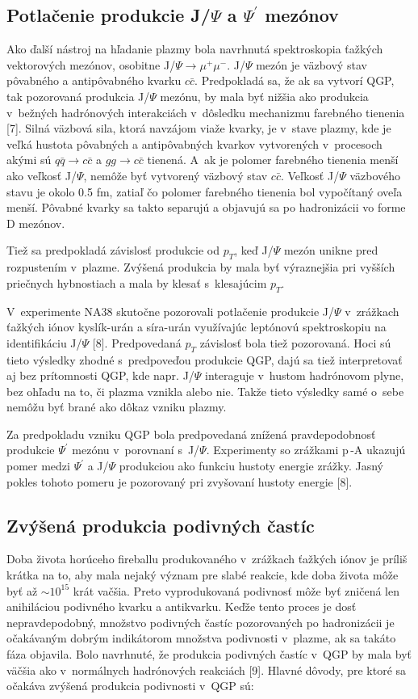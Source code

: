 \subsection{Potlačenie produkcie J/$\Psi$ a $\Psi^{'}$ mezónov}
Ako ďalší nástroj na hľadanie plazmy bola navrhnutá 
spektroskopia ťažkých vektorových mezónov, osobitne J/$\Psi
\longrightarrow \mu^{+} \mu^{-}$. J/$\Psi$ mezón je väzbový stav
pôvabného a antipôvabného kvarku $c\bar{c}$. Predpokladá sa, že
ak sa vytvorí QGP, tak pozorovaná produkcia J/$\Psi$ mezónu, by mala
byť nižšia ako produkcia v~bežných hadrónových
interakciách v~dôsledku mechanizmu farebného tienenia [7]. Silná
väzbová sila, ktorá navzájom viaže kvarky, je v~stave plazmy,
kde je veľká hustota pôvabných a antipôvabných kvarkov
vytvorených v~procesoch akými sú $q\bar{q} \rightarrow c\bar{c}$ a $gg
\rightarrow c\bar{c}$ tienená.
A~ak je polomer farebného tienenia menší ako veľkosť
J/$\Psi$, nemôže byť vytvorený väzbový stav $c\bar{c}$.
Veľkosť J/$\Psi$ väzbového stavu je okolo 0.5 fm, zatiaľ
čo polomer farebného tienenia  bol vypočítaný oveľa
menší. Pôvabné kvarky sa takto separujú a objavujú sa po
hadronizácii vo forme D mezónov.

Tiež sa predpokladá závislosť produkcie od $p_{T}$, keď
 J/$\Psi$  mezón unikne pred rozpustením v~plazme.
Zvýšená produkcia by mala byť výraznejšia pri
vyšších priečnych hybnostiach a mala by klesať 
s~klesajúcim $p_{T}$.

V~experimente NA38 skutočne pozorovali potlačenie produkcie
J/$\Psi$  v~zrážkach ťažkých iónov kyslík-urán a
síra-urán využívajúc leptónovú spektroskopiu na
identifikáciu J/$\Psi$ [8]. Predpovedaná $p_{T}$ závislosť bola
tiež pozorovaná. Hoci sú tieto výsledky zhodné s~predpoveďou
produkcie QGP, dajú sa tiež interpretovať aj bez prítomnosti
QGP, kde napr. J/$\Psi$ interaguje v~hustom hadrónovom plyne,
bez ohľadu na to, či plazma vznikla alebo nie. Takže tieto
výsledky samé o~sebe nemôžu byť brané ako dôkaz vzniku
plazmy.

Za predpokladu vzniku QGP bola predpovedaná znížená
pravdepodobnosť produkcie  $\Psi^{'}$ mezónu v~porovnaní
s~J/$\Psi$.
Experimenty so zrážkami p$\,$-A  ukazujú pomer medzi $\Psi^{'}$ a
J/$\Psi$ produkciou ako funkciu hustoty energie zrážky. Jasný pokles
tohoto pomeru je pozorovaný pri zvyšovaní hustoty energie [8].

\newpage \subsection{Zvýšená produkcia podivných častíc}
Doba života horúceho fireballu produkovaného v~zrážkach ťažkých
iónov je príliš krátka na to, aby mala
nejaký význam pre slabé reakcie, kde doba života môže byť
až $\sim 10^{15}$ krát vačšia. Preto vyprodukovaná
podivnosť môže byť zničená len anihiláciou podivného
kvarku a antikvarku. Keďže tento proces je dosť
nepravdepodobný, množstvo podivných častíc  pozorovaných
po hadronizácii je očakávaným dobrým indikátorom množstva
podivnosti  v~plazme, ak sa takáto fáza objavila.
Bolo navrhnuté, že produkcia podivných častíc v~QGP by mala
byť väčšia ako v~normálnych hadrónových reakciách [9].
Hlavné dôvody, pre ktoré sa očakáva zvýšená produkcia
podivnosti v~QGP sú:

